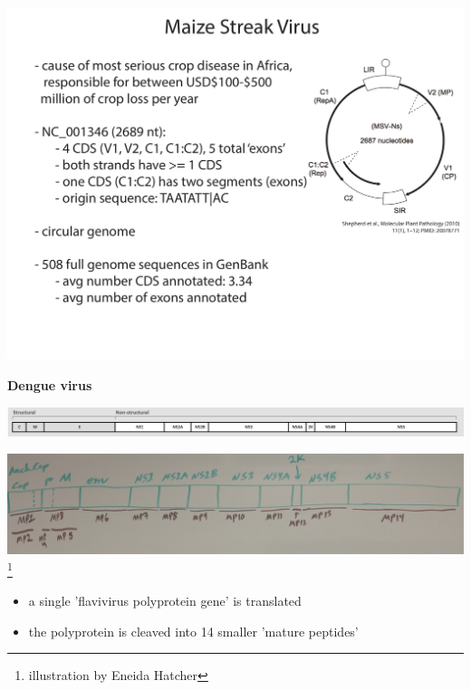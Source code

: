 \documentclass[landscape]{slides}
\begin{document}
\begin{slide}
\begin{center}

\includegraphics[width=10in]{figs/msv-slide}

\end{center}
\vfill
\end{slide}
\begin{slide}
\begin{center}
\textbf{Dengue virus}

\includegraphics[width=8in]{figs/dengue-genome-organization}

\includegraphics[width=8in]{figs/dengue-eneida}\footnote{illustration
  by Eneida Hatcher}

\begin{itemize}
\item a single 'flavivirus polyprotein gene' is translated
\item the polyprotein is cleaved into 14 smaller 'mature peptides'
\end{itemize}

\end{center}
\vfill
\end{slide}
\end{document}
